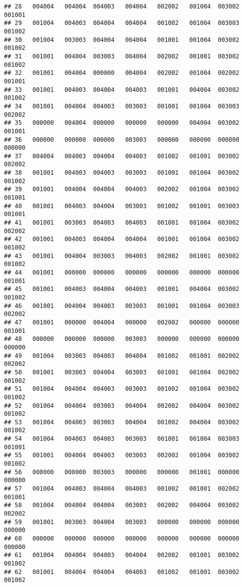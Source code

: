 \documentclass[
]{article}
\begin{document}
\begin{verbatim}
## 28   004004   004004  004003   004004   002002   001004  003002  001001
## 29   001004   004003  004004   004004   001002   001004  003003  001002
## 30   001004   003003  004004   004004   001001   001004  003002  001002
## 31   001001   004004  003003   004004   002002   001001  003002  001002
## 32   001001   004004  000000   004004   002002   001004  002002  001001
## 33   001001   004003  004004   004003   001001   004004  003002  001002
## 34   001001   004004  004003   003003   001001   001004  003003  002002
## 35   000000   004004  000000   000000   000000   004004  003002  001001
## 36   000000   000000  000000   003003   000000   000000  000000  000000
## 37   004004   004003  004004   004003   001002   001001  003002  002002
## 38   001001   004003  004003   003003   001001   001004  003002  001002
## 39   001001   004004  004004   004003   002002   001004  003002  001001
## 40   001001   004003  004004   003003   001002   001001  003003  001001
## 41   001001   003003  004003   004003   001001   001004  003002  002002
## 42   001001   004003  004004   004004   001001   001004  003002  001002
## 43   001001   004004  003003   004003   002002   001001  003002  001002
## 44   001001   000000  000000   000000   000000   000000  000000  001001
## 45   001001   004003  004004   004003   001001   004004  003002  001002
## 46   001001   004004  004003   003003   001001   001004  003003  002002
## 47   001001   000000  004004   000000   002002   000000  000000  001001
## 48   000000   000000  000000   003003   000000   000000  000000  000000
## 49   001004   003003  004003   004004   001002   001001  002002  002002
## 50   001001   003003  004004   003003   001001   001004  002002  001002
## 51   001004   004004  004003   003003   001002   001004  003002  001002
## 52   001004   004004  003003   004004   002002   004004  003002  001002
## 53   001004   004003  003003   004004   001002   004004  003002  001002
## 54   001004   004003  004003   003003   001001   001004  003003  001001
## 55   001001   004004  004003   003003   002002   001004  003002  001002
## 56   000000   000000  003003   000000   000000   001001  000000  000000
## 57   001004   004003  004004   004003   001002   001001  002002  001001
## 58   001004   004004  004004   003003   002002   004004  003002  002002
## 59   001001   003003  004004   003003   000000   000000  000000  000000
## 60   000000   000000  000000   000000   000000   000000  000000  000000
## 61   001004   004004  004003   004004   002002   001001  003002  001002
## 62   001001   004004  004004   004003   001002   001001  003002  001002

\end{verbatim}
\end{document}
